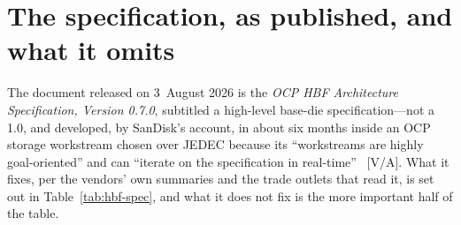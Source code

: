 \section{The specification, as published, and what it omits}

The document released on 3~August 2026 is the \emph{OCP HBF Architecture Specification, Version 0.7.0}, subtitled a high-level base-die specification---not a 1.0, and developed, by SanDisk's account, in about six months inside an OCP storage workstream chosen over JEDEC because its ``workstreams are highly goal-oriented'' and can ``iterate on the specification in real-time''~\cite{hbf-bf-spec,hbf-semieng} [V/A]. What it fixes, per the vendors' own summaries and the trade outlets that read it, is set out in Table~\ref{tab:hbf-spec}, and what it does not fix is the more important half of the table.

